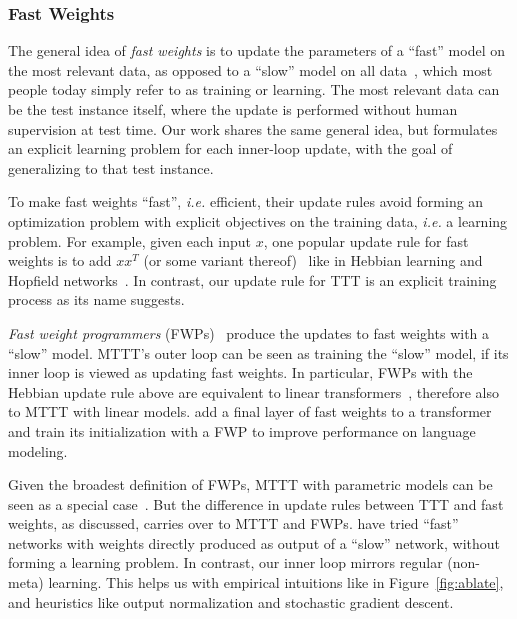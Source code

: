 \documentclass{article}
\begin{document}
\subsubsection{Fast Weights}
\label{subsubsec:fw}

The general idea of \emph{fast weights} is to update the parameters of a ``fast'' model on the most relevant data, as opposed to a ``slow'' model on all data~\citep{hinton1987using, tieleman2009using}, which most people today simply refer to as training or learning.
The most relevant data can be the test instance itself, where the update is performed without human supervision at test time.
Our work shares the same general idea, but formulates an explicit learning problem for each inner-loop update, with the goal of generalizing to that test instance. 

To make fast weights ``fast'', \textit{i.e.} efficient, their update rules avoid forming an optimization problem with explicit objectives on the training data, \textit{i.e.} a learning problem.
For example, given each input $x$, one popular update rule for fast weights is to add $xx^T$ (or some variant thereof)~\citep{ba2016using} like in Hebbian learning and Hopfield networks~\citep{hopfield1982neural}.
In contrast, our update rule for TTT is an explicit training process as its name suggests.

\emph{Fast weight programmers} (FWPs)~\citep{schmidhuber1992learning} produce the updates to fast weights with a ``slow'' model.
MTTT's outer loop can be seen as training the ``slow'' model, if its inner loop is viewed as updating fast weights.
In particular, FWPs with the Hebbian update rule above are equivalent to linear transformers~\citep{schlag2021linear}, therefore also to MTTT with linear models.
\cite{clark2022meta} add a final layer of fast weights to a transformer and train its initialization with a FWP to improve performance on language modeling.

Given the broadest definition of FWPs, MTTT with parametric models can be seen as a special case~\citep{kirsch2021meta}.
But the difference in update rules between TTT and fast weights, as discussed, carries over to MTTT and FWPs.
\cite{irie2021going} have tried ``fast'' networks with weights directly produced as output of a ``slow'' network, without forming a learning problem.
In contrast, our inner loop mirrors regular (non-meta) learning. This helps us with empirical intuitions like in Figure~\ref{fig:ablate}, and heuristics like output normalization and stochastic gradient descent.
\end{document}
